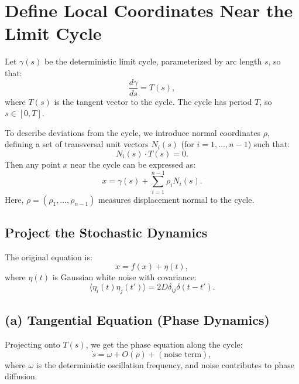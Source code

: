 \documentclass{article}
\theoremstyle{definition} \newtheorem{definition}{Definition}
\theoremstyle{remark} \newtheorem{remark}{Remark}
\newcounter{ct}
\begin{document}
\section{Define Local Coordinates Near the Limit Cycle}

Let $\gamma(s)$ be the deterministic limit cycle, parameterized by arc length $s$, so that:
\begin{equation}
    \frac{d \gamma}{ds} = T(s),
\end{equation}
where $T(s)$ is the tangent vector to the cycle. The cycle has period $T$, so $s \in [0, T]$.

To describe deviations from the cycle, we introduce normal coordinates $\rho$, defining a set of transversal unit vectors $N_i(s)$ (for $i = 1, \dots, n-1$) such that:
\begin{equation}
    N_i(s) \cdot T(s) = 0.
\end{equation}
Then any point $x$ near the cycle can be expressed as:
\begin{equation}
    x = \gamma(s) + \sum_{i=1}^{n-1} \rho_i N_i(s).
\end{equation}
Here, $\rho = (\rho_1, \dots, \rho_{n-1})$ measures displacement normal to the cycle.

\subsection{Project the Stochastic Dynamics}

The original equation is:
\begin{equation}
    \dot{x} = f(x) + \eta(t),
\end{equation}
where $\eta(t)$ is Gaussian white noise with covariance:
\begin{equation}
    \langle \eta_i(t) \eta_j(t') \rangle = 2D \delta_{ij} \delta(t - t').
\end{equation}

\subsection{(a) Tangential Equation (Phase Dynamics)}
Projecting onto $T(s)$, we get the phase equation along the cycle:
\begin{equation}
    \dot{s} = \omega + O(\rho) + (\text{noise term}),
\end{equation}
where $\omega$ is the deterministic oscillation frequency, and noise contributes to phase diffusion.
\end{document}
